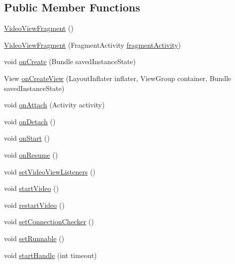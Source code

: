 \subsection*{Public Member Functions}
\begin{DoxyCompactItemize}
\item 
\hyperlink{classpt_1_1lsts_1_1asa_1_1fragments_1_1VideoViewFragment_ab72d2ab3013b36180d4d971894785cb5}{Video\+View\+Fragment} ()
\item 
\hyperlink{classpt_1_1lsts_1_1asa_1_1fragments_1_1VideoViewFragment_ac96721c753ce93f59f7b4af090110134}{Video\+View\+Fragment} (Fragment\+Activity \hyperlink{classpt_1_1lsts_1_1asa_1_1fragments_1_1VideoViewFragment_aeb88f42f68296885aed21df5ef1296a8}{fragment\+Activity})
\item 
void \hyperlink{classpt_1_1lsts_1_1asa_1_1fragments_1_1VideoViewFragment_a6cdc955b7283e934acf2c58cea6742a2}{on\+Create} (Bundle saved\+Instance\+State)
\item 
View \hyperlink{classpt_1_1lsts_1_1asa_1_1fragments_1_1VideoViewFragment_a492772a2d1457b983d299466b976df87}{on\+Create\+View} (Layout\+Inflater inflater, View\+Group container, Bundle saved\+Instance\+State)
\item 
void \hyperlink{classpt_1_1lsts_1_1asa_1_1fragments_1_1VideoViewFragment_a0f80faeb81dfbfa068a80ac67c7d16f8}{on\+Attach} (Activity activity)
\item 
void \hyperlink{classpt_1_1lsts_1_1asa_1_1fragments_1_1VideoViewFragment_a1e131c894c38ddc2a3325e08d081c0ee}{on\+Detach} ()
\item 
void \hyperlink{classpt_1_1lsts_1_1asa_1_1fragments_1_1VideoViewFragment_ab3e341f095706ebd1dd9d58cf557a90d}{on\+Start} ()
\item 
void \hyperlink{classpt_1_1lsts_1_1asa_1_1fragments_1_1VideoViewFragment_a58fba05677c7d080bb4bd5db75616b4e}{on\+Resume} ()
\item 
void \hyperlink{classpt_1_1lsts_1_1asa_1_1fragments_1_1VideoViewFragment_ad9e8fda00aef515b0355966089592da2}{set\+Video\+View\+Listeners} ()
\item 
void \hyperlink{classpt_1_1lsts_1_1asa_1_1fragments_1_1VideoViewFragment_a6b4460132d8c2fe2b693009f141c02c7}{start\+Video} ()
\item 
void \hyperlink{classpt_1_1lsts_1_1asa_1_1fragments_1_1VideoViewFragment_a19fd1dfab2d1fc8d3fa8203777d2ee16}{restart\+Video} ()
\item 
void \hyperlink{classpt_1_1lsts_1_1asa_1_1fragments_1_1VideoViewFragment_adab837c3a43f05ce066fb99950fe50fc}{set\+Connection\+Checker} ()
\item 
void \hyperlink{classpt_1_1lsts_1_1asa_1_1fragments_1_1VideoViewFragment_a4c75fa27d91299f95f01b58f25f3ef3d}{set\+Runnable} ()
\item 
void \hyperlink{classpt_1_1lsts_1_1asa_1_1fragments_1_1VideoViewFragment_adea2a0ef71021c27b7fcb69047d32664}{start\+Handle} (int timeout)
\end{DoxyCompactItemize}
